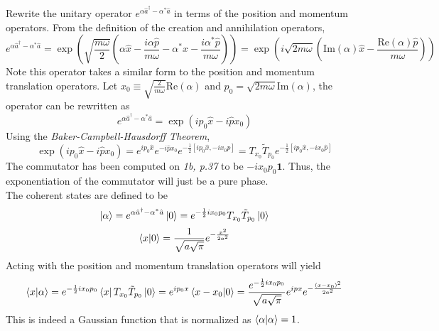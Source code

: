 \begin{sol}
Rewrite the unitary operator $e^{\alpha\hat a^\dagger-\alpha^*\hat a}$ in terms of the position and momentum operators. From the definition of the creation and annihilation operators,
$$e^{\alpha\hat a^\dagger-\alpha^*\hat a}=\exp\left(\sqrt{\frac{m\omega}{2}}\left(\alpha\hat x-\frac{i\alpha\hat p}{m\omega}-\alpha^*\hat x-\frac{i\alpha^*\hat p}{m\omega}\right)\right)=\exp\left(i\sqrt{2m\omega}\left(\text{Im}(\alpha)\hat x-\frac{\text{Re}(\alpha)\hat p}{m\omega}\right)\right)$$
Note this operator takes a similar form to the position and momentum translation operators. Let $x_0\equiv\sqrt{\frac{2}{m\omega}}\text{Re}(\alpha)$ and $p_0=\sqrt{2m\omega}\text{Im}(\alpha)$, the operator can be rewritten as
$$e^{\alpha\hat a^\dagger-\alpha^*\hat a}=\exp(ip_0\hat x-i\hat px_0)$$
Using the \textit{Baker-Campbell-Hausdorff Theorem}, 
$$\exp(ip_0\hat x-i\hat px_0)=e^{ip_0\hat x}e^{-i\hat px_0}e^{-\frac{1}{2}[ip_0\hat x,-ix_0\hat p]}=T_{x_0}\tilde {T}_{p_0}e^{-\frac{1}{2}[ip_0\hat x,-ix_0\hat p]}$$ 
The commutator has been computed on \textit{1b, p.37} to be $-ix_0p_0\mathbf{1}$. Thus, the exponentiation of the commutator will just be a pure phase.\\
The coherent states are defined to be
$$\ket\alpha=e^{\alpha\hat a^\dagger-\alpha^*\hat a}\ket 0=e^{-\frac{1}{2}ix_0p_0}T_{x_0}\tilde {T}_{p_0}\ket 0$$ 
$$\braket{x}{0}=\frac{1}{\sqrt{a\sqrt{\pi}}}e^{-\frac{x^2}{2a^2}}$$
Acting with the position and momentum translation operators will yield
$$\braket{x}{\alpha}=e^{-\frac{1}{2}ix_0p_0}\bra xT_{x_0}\tilde {T}_{p_0}\ket 0=e^{ip_0x}\braket{x-x_0}{0}=\frac{e^{-\frac{1}{2}ix_0p_0}}{\sqrt{a\sqrt{\pi}}}e^{ipx}e^{-\frac{(x-x_0)^2}{2a^2}}$$ 
This is indeed a Gaussian function that is normalized as $\braket{\alpha}{\alpha}=1$.
\end{sol}